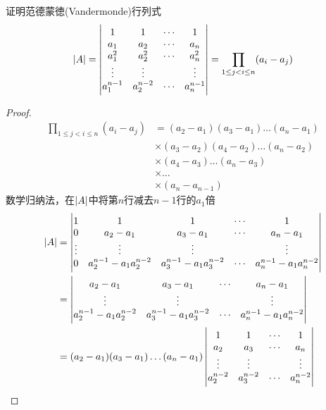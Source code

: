 \documentclass[11pt]{article}
\begin{document}
\begin{proposition}[]
\label{prop2.6}
证明范德蒙徳(Vandermonde)行列式
\begin{equation*}
\abs{A}=
\begin{vmatrix}
1&1&\cdots&1\\
a_1&a_2&\cdots&a_n\\
a_1^2&a_2^2&\cdots&a_n^2\\
\vdots&\vdots&&\vdots\\
a_1^{n-1}&a_2^{n-2}&\cdots&a_{n}^{n-1}
\end{vmatrix}=
\prod_{1\le j<i\le n}(a_i-a_j)
\end{equation*}
\end{proposition}

\begin{proof}
\begin{align*}
\prod_{1\le j<i\le n}(a_i-a_j)&=(a_2-a_1)(a_3-a_1)\dots(a_n-a_1)\\
&\times (a_3-a_2)(a_4-a_2)\dots(a_n-a_2)\\
&\times(a_4-a_3)\dots(a_n-a_3)\\
&\times\dots\\
&\times(a_n-a_{n-1})
\end{align*}
数学归纳法，在\(\abs{A}\)中将第\(n\)行减去\(n-1\)行的\(a_1\)倍
\begin{align*}
\abs{A}&=
\begin{vmatrix}
1&1&1&\cdots&1\\
0&a_2-a_1&a_3-a_1&\cdots&a_n-a_1\\
\vdots&\vdots&\vdots&&\vdots\\
0&a_2^{n-1}-a_1a_2^{n-2}&a_3^{n-1}-a_1a_3^{n-2}&\cdots&
a_n^{n-1}-a_1a_n^{n-2}
\end{vmatrix}\\
&=
\begin{vmatrix}
a_2-a_1&a_3-a_1&\cdots&a_n-a_1\\
\vdots&\vdots&&\vdots\\
a_2^{n-1}-a_1a_2^{n-2}&a_3^{n-1}-a_1a_3^{n-2}&\cdots&
a_n^{n-1}-a_1a_n^{n-2}
\end{vmatrix}\\
&=(a_2-a_1)(a_3-a_1)\dots(a_n-a_1)
\begin{vmatrix}
1&1&\cdots&1\\
a_2&a_3&\cdots&a_n\\
\vdots&\vdots&&\vdots\\
a_2^{n-2}&a_3^{n-2}&\cdots&a_n^{n-2}
\end{vmatrix}
\end{align*}
\end{proof}
\end{document}
